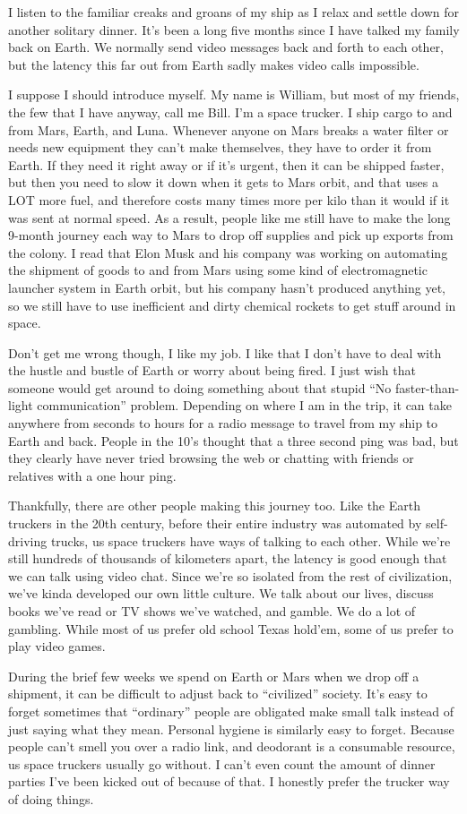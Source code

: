 \documentclass[main.tex]{subfiles}
\begin{document}
I listen to the familiar creaks and groans of my ship as I relax and settle down for another solitary dinner.
It’s been a long five months since I have talked my family back on Earth.
We normally send video messages back and forth to each other, but the latency this far out from Earth sadly makes video
calls impossible.

I suppose I should introduce myself.
My name is William, but most of my friends, the few that I have anyway, call me Bill.
I’m a space trucker.
I ship cargo to and from Mars, Earth, and Luna.
Whenever anyone on Mars breaks a water filter or needs new equipment they can’t make themselves, they have to order it
from Earth.
If they need it right away or if it’s urgent, then it can be shipped faster, but then you need to slow it down when it
gets to Mars orbit, and that uses a LOT more fuel, and therefore costs many times more per kilo than it would if it was
sent at normal speed.
As a result, people like me still have to make the long 9-month journey each way to Mars to drop off supplies and pick
up exports from the colony.
I read that Elon Musk and his company was working on automating the shipment of goods to and from Mars using some kind
of electromagnetic launcher system in Earth orbit, but his company hasn’t produced anything yet, so we still have to use
inefficient and dirty chemical rockets to get stuff around in space.

Don’t get me wrong though, I like my job.
I like that I don’t have to deal with the hustle and bustle of Earth or worry about being fired.
I just wish that someone would get around to doing something about that stupid ``No faster-than-light communication''
problem.
Depending on where I am in the trip, it can take anywhere from seconds to hours for a radio message to travel from my
ship to Earth and back.
People in the 10’s thought that a three second ping was bad, but they clearly have never tried browsing the web or
chatting with friends or relatives with a one hour ping.

Thankfully, there are other people making this journey too.
Like the Earth truckers in the 20th century, before their entire industry was automated by self-driving trucks, us space
truckers have ways of talking to each other.
While we’re still hundreds of thousands of kilometers apart, the latency is good enough that we can talk using video
chat.
Since we’re so isolated from the rest of civilization, we’ve kinda developed our own little culture.
We talk about our lives, discuss books we’ve read or TV shows we’ve watched, and gamble.
We do a lot of gambling.
While most of us prefer old school Texas hold’em, some of us prefer to play video games.

During the brief few weeks we spend on Earth or Mars when we drop off a shipment, it can be difficult to adjust back to
“civilized” society. 
It's easy to forget sometimes that “ordinary” people are obligated make small talk instead of just saying what
they mean.  
Personal hygiene is similarly easy to forget.  
Because people can’t smell you over a radio link, and deodorant is a consumable resource, us space truckers usually go without.  
I can’t even count the amount of dinner parties I’ve been kicked out of because of that.
I honestly prefer the trucker way of doing things.
\end{document}
